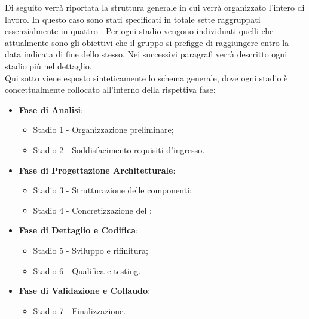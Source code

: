 Di seguito verrà riportata la struttura generale in cui verrà organizzato l'intero  di lavoro. In questo caso sono stati specificati in totale sette  raggruppati essenzialmente in quattro . Per ogni stadio vengono individuati quelli che attualmente sono gli obiettivi che il gruppo \Gruppo{} si prefigge di raggiungere entro la data indicata di fine dello stesso. Nei successivi paragrafi verrà descritto ogni stadio più nel dettaglio.\\
Qui sotto viene esposto sinteticamente lo schema generale, dove ogni stadio è concettualmente collocato all'interno della rispettiva fase:

\begin{itemize}
    \item \textbf{Fase di Analisi}:
    \begin{itemize}
        \item Stadio 1 - Organizzazione preliminare;
        \item Stadio 2 - Soddisfacimento requisiti d'ingresso.
    \end{itemize}

    \item \textbf{Fase di Progettazione Architetturale}:
    \begin{itemize}
        \item Stadio 3 - Strutturazione delle componenti;
        \item Stadio 4 - Concretizzazione del ;
    \end{itemize}

    \item \textbf{Fase di Dettaglio e Codifica}:
    \begin{itemize}  
        \item Stadio 5 - Sviluppo e rifinitura;
        \item Stadio 6 - Qualifica e testing.
    \end{itemize}

    \item \textbf{Fase di Validazione e Collaudo}:
    \begin{itemize}        
        \item Stadio 7 - Finalizzazione.
    \end{itemize}
\end{itemize}

